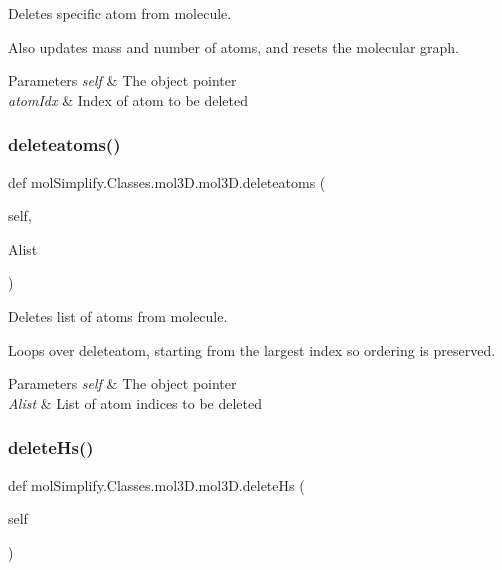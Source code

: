 Deletes specific atom from molecule. 

Also updates mass and number of atoms, and resets the molecular graph. 
\begin{DoxyParams}{Parameters}
{\em self} & The object pointer \\
\hline
{\em atom\+Idx} & Index of atom to be deleted \\
\hline
\end{DoxyParams}
\mbox{\label{classmolSimplify_1_1Classes_1_1mol3D_1_1mol3D_a98613e0d849dd341b6cec837877e214b}} 
\subsubsection{\texorpdfstring{deleteatoms()}{deleteatoms()}}
{\footnotesize\ttfamily def mol\+Simplify.\+Classes.\+mol3\+D.\+mol3\+D.\+deleteatoms (\begin{DoxyParamCaption}\item[{}]{self,  }\item[{}]{Alist }\end{DoxyParamCaption})}



Deletes list of atoms from molecule. 

Loops over deleteatom, starting from the largest index so ordering is preserved. 
\begin{DoxyParams}{Parameters}
{\em self} & The object pointer \\
\hline
{\em Alist} & List of atom indices to be deleted \\
\hline
\end{DoxyParams}
\mbox{\label{classmolSimplify_1_1Classes_1_1mol3D_1_1mol3D_a91e56cc05405772f174a4eda98d86f41}} 
\subsubsection{\texorpdfstring{delete\+Hs()}{deleteHs()}}
{\footnotesize\ttfamily def mol\+Simplify.\+Classes.\+mol3\+D.\+mol3\+D.\+delete\+Hs (\begin{DoxyParamCaption}\item[{}]{self }\end{DoxyParamCaption})}



